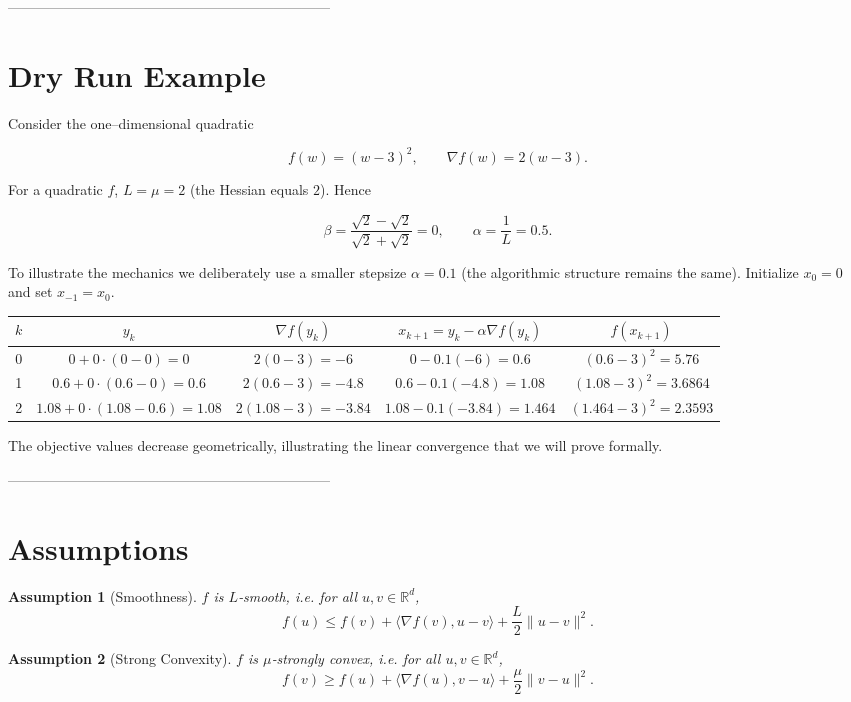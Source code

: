\documentclass{article}
\newtheorem{assumption}{Assumption}
\newcommand{\grad}{\nabla}
\newcommand{\R}{\mathbb{R}}
\begin{document}
---------------------------------------------------------------------

\section*{Dry Run Example}
Consider the one–dimensional quadratic  

\[
f(w)= (w-3)^{2},\qquad \grad f(w)=2(w-3).
\]

For a quadratic $f$, $L=\mu=2$ (the Hessian equals $2$).  
Hence  

\[
\beta =\frac{\sqrt{2}-\sqrt{2}}{\sqrt{2}+\sqrt{2}}=0,\qquad 
\alpha =\frac{1}{L}=0.5.
\]

To illustrate the mechanics we deliberately use a smaller stepsize $\alpha=0.1$ (the algorithmic structure remains the same).  
Initialize $x_{0}=0$ and set $x_{-1}=x_{0}$.

\begin{center}
\begin{tabular}{c|c|c|c|c}
$k$ & $y_{k}$ & $\grad f(y_{k})$ & $x_{k+1}=y_{k}-\alpha\grad f(y_{k})$ & $f(x_{k+1})$\\ \hline
0 & $0+0\cdot(0-0)=0$ & $2(0-3)=-6$ & $0-0.1(-6)=0.6$ & $(0.6-3)^{2}=5.76$\\[2mm]
1 & $0.6+0\cdot(0.6-0)=0.6$ & $2(0.6-3)=-4.8$ & $0.6-0.1(-4.8)=1.08$ & $(1.08-3)^{2}=3.6864$\\[2mm]
2 & $1.08+0\cdot(1.08-0.6)=1.08$ & $2(1.08-3)=-3.84$ & $1.08-0.1(-3.84)=1.464$ & $(1.464-3)^{2}=2.3593$
\end{tabular}
\end{center}

The objective values decrease geometrically, illustrating the linear convergence that we will prove formally.

---------------------------------------------------------------------

\section*{Assumptions}
\begin{assumption}[Smoothness]\label{ass:smooth}
$f$ is $L$‑smooth, i.e. for all $u,v\in\R^{d}$,
\[
f(u)\le f(v)+\langle \grad f(v),u-v\rangle+\frac{L}{2}\|u-v\|^{2}.
\tag{2}
\]
\end{assumption}

\begin{assumption}[Strong Convexity]\label{ass:strong}
$f$ is $\mu$‑strongly convex, i.e. for all $u,v\in\R^{d}$,
\[
f(v)\ge f(u)+\langle \grad f(u),v-u\rangle+\frac{\mu}{2}\|v-u\|^{2}.
\tag{3}
\]
\end{assumption}
\end{document}
